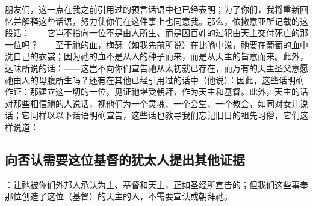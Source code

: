 朋友们，这一点在我之前引用过的预言话语中也已经表明；为了你们，我将重新回忆并解释这些话语，努力使你们在这件事上也同意我。那么，依撒意亚所记载的这段话：——它岂不指向一位不是由人所生、而是因百姓的过犯由天主交付死亡的那一位吗？——至于祂的血，梅瑟（如我先前所说）在比喻中说，祂要在葡萄的血中洗自己的衣裳；因为祂的血不是从人的种子而来，而是从天主的旨意而来。此外，达味所说的话：——这岂不向你们宣告祂从太初就已存在，而万有的天主圣父意愿祂由人的母腹所生吗？还有在其他已经引用过的话中（他说）：因此，这些话明确作证：那建立这一切的一位，见证祂堪受朝拜，作为天主和基督。此外，天主的话对那些相信祂的人说话，视他们为一个灵魂、一个会堂、一个教会，如同对女儿说话；它同样以以下话语明确宣告，这些话也教导我们忘记旧日的祖先习俗，它们这样说道：\par


\subsection{向否认需要这位基督的犹太人提出其他证据}

：让祂被你们外邦人承认为主、基督和天主，正如圣经所宣告的；但我们这些事奉那位创造了这位（基督）的天主的人，不需要宣认或朝拜祂。\par

